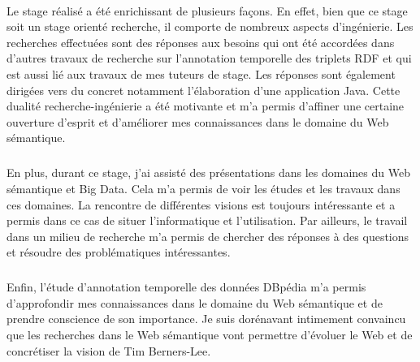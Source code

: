 \documentclass[12pt,a4	]{report}
\begin{document}
\paragraph{}
Le stage réalisé a été enrichissant de plusieurs façons. En effet, bien que ce stage soit un stage orienté recherche, il comporte de nombreux aspects d'ingénierie. Les recherches effectuées sont des réponses aux besoins qui ont été accordées dans d'autres travaux de recherche sur l'annotation temporelle des triplets RDF et qui est aussi lié aux travaux de mes tuteurs de stage. Les réponses sont également dirigées vers du concret notamment l'élaboration d'une application Java. Cette dualité recherche-ingénierie a été motivante et m'a permis d'affiner une certaine ouverture d'esprit et d'améliorer mes connaissances dans le domaine du Web sémantique.
\subparagraph{}
En plus, durant ce stage, j'ai assisté des présentations dans les domaines du Web sémantique et Big Data. Cela m'a permis de voir les études et les travaux dans ces domaines. La rencontre de différentes visions est toujours intéressante et a permis dans ce cas de situer l'informatique et l'utilisation. Par ailleurs, le travail dans un milieu de recherche m'a permis de chercher des réponses à des questions et résoudre des problématiques intéressantes.
\subparagraph{}
Enfin, l'étude d'annotation temporelle des données DBpédia m'a permis d'approfondir mes connaissances dans le domaine du Web sémantique et de prendre conscience de son importance. Je suis dorénavant intimement convaincu que les recherches dans le Web sémantique vont permettre d'évoluer le Web et de concrétiser la vision de Tim Berners-Lee.  
\end{document}
